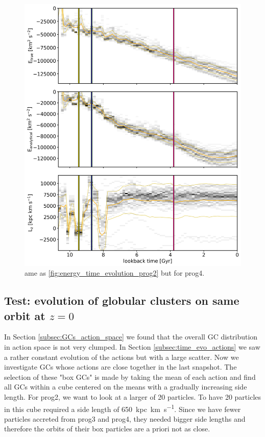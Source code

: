 \begin{figure}[htbp]
\captionsetup{format=plain}
    \centering
	\includegraphics[width=\textwidth]{plots/Dynamics/prog4/energy_time_evolution_hist_mean.png}
    \caption{ame as \ref{fig:energy_time_evolution_prog2} but for prog4.}\label{fig:energy_time_evolution_prog4}
\end{figure}
\fi

\subsection{Test: evolution of globular clusters on same orbit at $z=0$}\label{subsec:box_GCs}
In Section \ref{subsec:GCs_action_space} we found that the overall \ac{GC} distribution in action space is not very clumped. In Section \ref{subsec:time_evo_actions} we saw a rather constant evolution of the actions but with a large scatter. Now we investigate \acp{GC} whose actions are close together in the last snapshot. The selection of these "box \acp{GC}" is made by taking the mean of each action and find all \acp{GC} within a cube centered on the means with a gradually increasing side length. For prog2, we want to look at a larger of 20 particles. To have 20 particles in this cube required a side length of \SI{650}{kpc.km.s^{-1}}. Since we have fewer particles accreted from prog3 and prog4, they needed bigger side lengths and therefore the orbits of their box particles are a priori not as close.  

